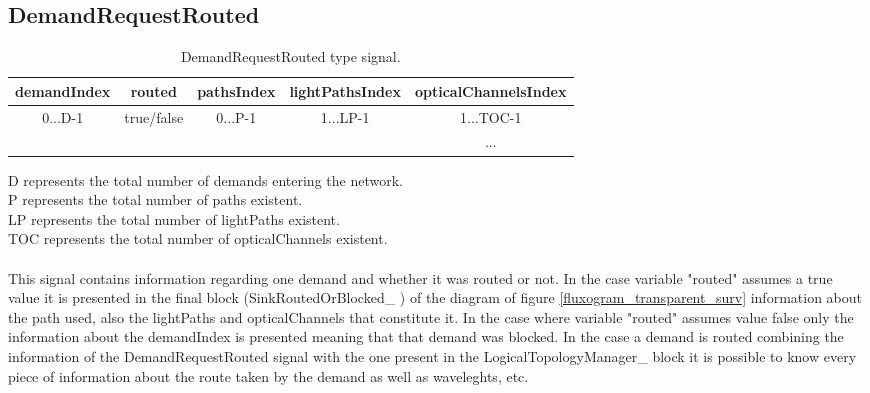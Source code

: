\subsection{DemandRequestRouted}

\begin{table}[H]
	\centering
\begin{tabular}{|c|c|c|c|c|}
	\hline
	demandIndex               & routed                      & pathsIndex               & lightPathsIndex           & opticalChannelsIndex \\ \hline
	\multirow{2}{*}{0...D-1} & \multirow{2}{*}{true/false} & \multirow{2}{*}{0...P-1} & \multirow{2}{*}{1...LP-1} & 1...TOC-1            \\ \cline{5-5} 
	&                             &                          &                           & ...                  \\ \hline
\end{tabular}
	\caption{DemandRequestRouted type signal.}
\label{DemandRequestRouted}
\end{table}

D represents the total number of demands entering the network.\\
P represents the total number of paths existent.\\
LP represents the total number of lightPaths existent.\\
TOC represents the total number of opticalChannels existent.\\ \\

This signal contains information regarding one demand and whether it was routed or not. In the case variable "routed" assumes a true value it is presented in the final block (SinkRoutedOrBlocked\_ ) of the diagram of figure \ref{fluxogram_transparent_surv} information about the path used, also the lightPaths  and opticalChannels that constitute it. In the case where variable "routed" assumes value false only the information about the demandIndex is presented meaning that that demand was blocked. In the case a demand is routed combining the information of the DemandRequestRouted signal with the one present in the LogicalTopologyManager\_  block it is possible to know every piece of information about the route taken by the demand as well as waveleghts, etc. 


